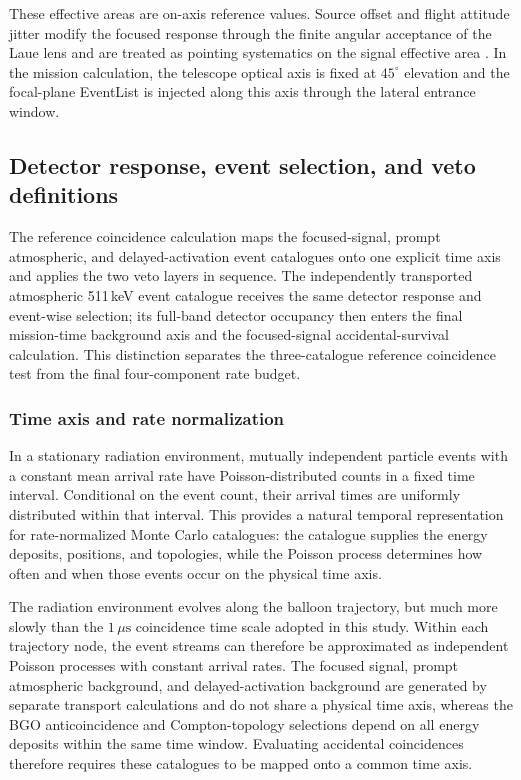 \documentclass[11pt]{article}
\begin{document}
These effective areas are on-axis reference values. Source offset and flight
attitude jitter modify the focused response through the finite angular acceptance
of the Laue lens and are treated as pointing systematics on the signal effective
area \cite{Barriere2009Laue,Weidenspointner2006MAX}. In the mission calculation,
the telescope optical axis is fixed at $45^\circ$ elevation and the focal-plane
EventList is injected along this axis through the lateral entrance window.

\subsection{Detector response, event selection, and veto definitions}
\label{sec:selection}

The reference coincidence calculation maps the focused-signal, prompt
atmospheric, and delayed-activation event catalogues onto one explicit time axis
and applies the two veto layers in sequence. The
independently transported atmospheric 511\,keV event catalogue receives the same
detector response and event-wise selection; its full-band detector occupancy
then enters the final mission-time background axis and the focused-signal
accidental-survival calculation. This
distinction separates the three-catalogue reference coincidence test from the
final four-component rate budget.

\subsubsection{Time axis and rate normalization}
\label{subsec:time_axis}

In a stationary radiation environment, mutually independent particle events
with a constant mean arrival rate have Poisson-distributed counts in a fixed
time interval. Conditional on the event count, their arrival times are
uniformly distributed within that interval. This provides a natural temporal
representation for rate-normalized Monte Carlo catalogues: the catalogue
supplies the energy deposits, positions, and topologies, while the Poisson
process determines how often and when those events occur on the physical time
axis.

The radiation environment evolves along the balloon trajectory, but much more
slowly than the $1\,\mu\mathrm{s}$ coincidence time scale adopted in this study.
Within each trajectory node, the event streams can therefore be approximated as
independent Poisson processes with constant arrival rates. The focused signal,
prompt atmospheric background, and delayed-activation background are generated
by separate transport calculations and do not share a physical time axis,
whereas the BGO anticoincidence and Compton-topology selections depend on all
energy deposits within the same time window. Evaluating accidental coincidences
therefore requires these catalogues to be mapped onto a common time axis.
\end{document}
